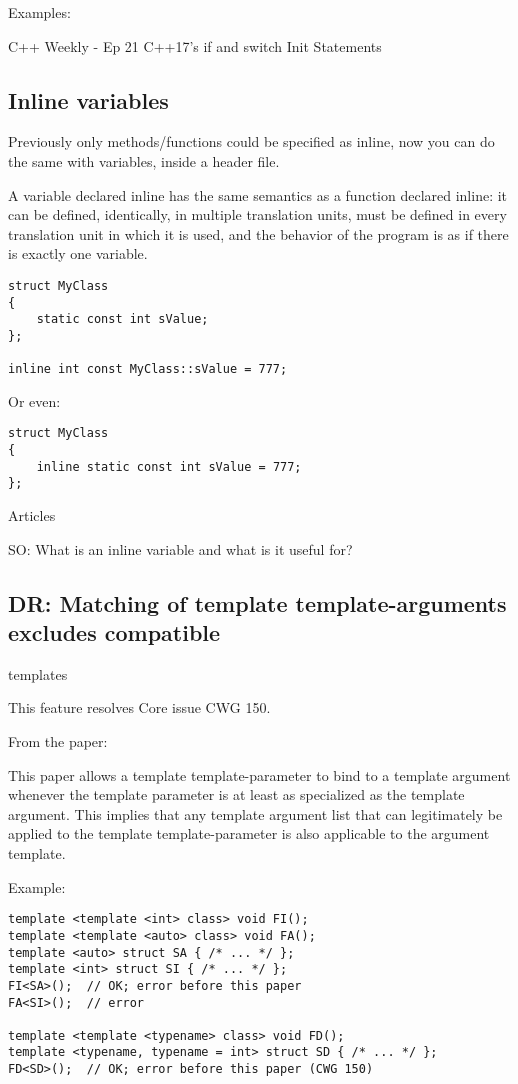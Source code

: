 Examples:

C++ Weekly - Ep 21 C++17’s if and switch Init Statements

\subsection{Inline variables}

Previously only methods/functions could be specified as inline, now you can do the same with variables, inside a header file.

A variable declared inline has the same semantics as a function declared inline: it can be defined, identically, in multiple translation units, must be defined in every translation unit in which it is used, and the behavior of the program is as if there is exactly one variable.

\begin{verbatim}
struct MyClass
{
    static const int sValue;
};

inline int const MyClass::sValue = 777;
\end{verbatim}

Or even:
\begin{verbatim}
struct MyClass
{
    inline static const int sValue = 777;
};
\end{verbatim}

Articles

SO: What is an inline variable and what is it useful for?

\subsection{DR: Matching of template template-arguments excludes compatible} templates

This feature resolves Core issue CWG 150.

From the paper:

This paper allows a template template-parameter to bind to a template argument whenever the template parameter is at least as specialized as the template argument. This implies that any template argument list that can legitimately be applied to the template template-parameter is also applicable to the argument template.

Example:

\begin{verbatim}
template <template <int> class> void FI();
template <template <auto> class> void FA();
template <auto> struct SA { /* ... */ };
template <int> struct SI { /* ... */ };
FI<SA>();  // OK; error before this paper
FA<SI>();  // error

template <template <typename> class> void FD();
template <typename, typename = int> struct SD { /* ... */ };
FD<SD>();  // OK; error before this paper (CWG 150)
\end{verbatim}

